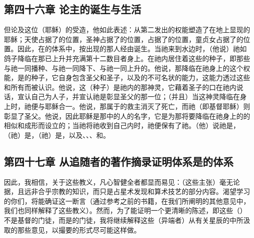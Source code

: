 
\subsection{第四十六章 论主的诞生与生活}

但论及这位（耶稣）的受造，他如此表述：从第二发出的权能塑造了在地上显现的耶稣；天使占据了的位置，圣神占据了的位置，占据了的位置，童贞女占据了的位置。因此，在的体系中，按出现的那人经由诞生。当祂来到水边时，（他说）祂如鸽子降临在那已上升并充满第十二数目者身上。在祂内居住着这些的种子，即那些与祂一同播种、与祂一同降下、与祂一同上升的。他说，那降临在祂身上的这个权能，是的种子，它自身包含圣父和圣子，以及的不可名状的能力，这能力透过这些和所有而被认识。他说，这（种子）是祂内的那神灵，它藉着圣子的口在祂内说话，宣认自己为人子，并宣认祂是彰显圣父的那一位；（并且）当这神灵降临在身上时，祂便与耶稣合一。他说，那属于的救主消灭了死亡，而祂（即基督耶稣）则彰显了圣父。他说，因此耶稣是那中的人的名字，它是为那将要降临在祂身上的的相似和成形而设立的；当祂将祂收到自己内时，祂便保有了祂。（他）说祂是，（祂）是，（祂）是，以及、、、和。\par


\subsection{第四十七章 从追随者的著作摘录证明体系是的体系}

因此，我相信，关于这些教义，凡心智健全者都显而易见：（这些主张）毫无论据，且远非合乎宗教的知识，而只是占星术发现和算术技艺的部分内容。渴望学习的你们，将能确证这一断言（通过参考之前的书籍，在我们所阐明的其他意见中，我们也同样解释了这些教义）。然而，为了能证明一个更清晰的陈述，即这些（）不是基督的门徒，而是的门徒，我将继续解释这些（异端者）从有关星辰的中所汲取的那些意见，以撮要的形式尽可能这样做。\par

